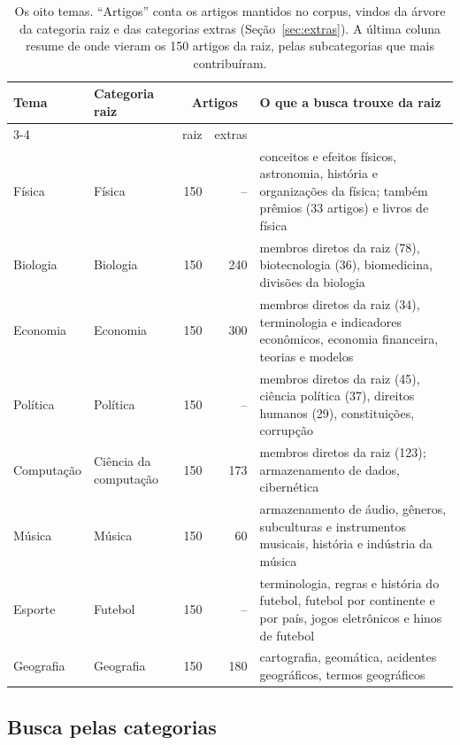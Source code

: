 \begin{table}[htbp]
\centering
\caption{Os oito temas. ``Artigos'' conta os artigos mantidos no corpus, vindos da árvore da
categoria raiz e das categorias extras (Seção~\ref{sec:extras}). A última coluna resume de onde
vieram os 150 artigos da raiz, pelas subcategorias que mais contribuíram.}\label{tab:temas}
\small
\begin{tabularx}{\linewidth}{@{}l l r r >{\raggedright\arraybackslash}X@{}}
\toprule
\textbf{Tema} & \textbf{Categoria raiz} & \multicolumn{2}{c}{\textbf{Artigos}} &
\textbf{O que a busca trouxe da raiz} \\
\cmidrule(lr){3-4}
& & raiz & extras & \\
\midrule
Física & Física & 150 & -- & conceitos e efeitos físicos, astronomia, história e
organizações da física; também prêmios (33 artigos) e livros de física \\
Biologia & Biologia & 150 & 240 & membros diretos da raiz (78), biotecnologia (36),
biomedicina, divisões da biologia \\
Economia & Economia & 150 & 300 & membros diretos da raiz (34), terminologia e indicadores
econômicos, economia financeira, teorias e modelos \\
Política & Política & 150 & -- & membros diretos da raiz (45), ciência política (37),
direitos humanos (29), constituições, corrupção \\
Computação & Ciência da computação & 150 & 173 & membros diretos da raiz (123);
armazenamento de dados, cibernética \\
Música & Música & 150 & 60 & armazenamento de áudio, gêneros, subculturas e instrumentos
musicais, história e indústria da música \\
Esporte & Futebol & 150 & -- & terminologia, regras e história do futebol, futebol por
continente e por país, jogos eletrônicos e hinos de futebol \\
Geografia & Geografia & 150 & 180 & cartografia, geomática, acidentes geográficos, termos
geográficos \\
\bottomrule
\end{tabularx}
\end{table}

\subsection{Busca pelas categorias}\label{sec:busca}

